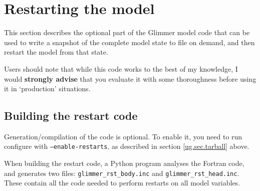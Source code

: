\section{Restarting the model}
%
This section describes the optional part of the Glimmer model code
that can be used to write a snapshot of the complete model state to
file on demand, and then restart the model from that state.

Users should note that while this code works to the best of my
knowledge, I would {\bf strongly advise} that you evaluate it with
some thoroughness before using it in `production' situations.
%
\subsection{Building the restart code}
%
Generation/compilation of the code is optional. To enable it, you need 
to run configure with \texttt{--enable-restarts}, as described in
section \ref{ug.sec.tarball} above.

When building the restart code, a Python program analyses the Fortran
code, and generates two files: \texttt{glimmer\_rst\_body.inc}  and 
\texttt{glimmer\_rst\_head.inc}. These contain all the code needed to
perform restarts on all model variables.
%
